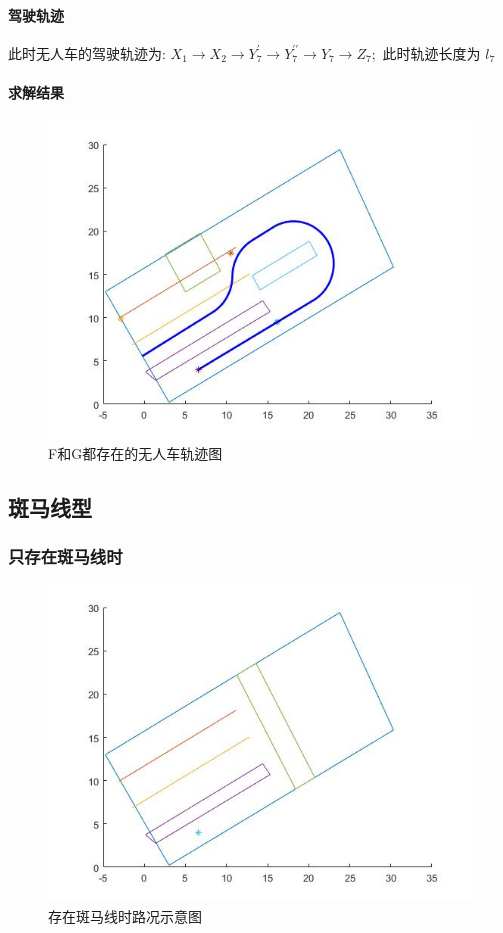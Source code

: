 \documentclass{article}
\begin{document}
\paragraph{驾驶轨迹}
此时无人车的驾驶轨迹为:
$X_{1} \rightarrow X_{2} \rightarrow Y_{7}^{\prime} \rightarrow Y_{7}^{\prime \prime} \rightarrow Y_{7} \rightarrow Z_{7} ;$ 此时轨迹长度为 $l_{7}$

\paragraph{求解结果}
\begin{figure}[H]
    \centering
    \includegraphics[scale=0.5]{20.jpg}
    \caption{F和G都存在的无人车轨迹图}
\end{figure}

\subsection{斑马线型}
\subsubsection{只存在斑马线时}
\begin{figure}[H]
    \centering
    \includegraphics[scale=0.5]{21.jpg}
    \caption{存在斑马线时路况示意图}
\end{figure}
\end{document}
